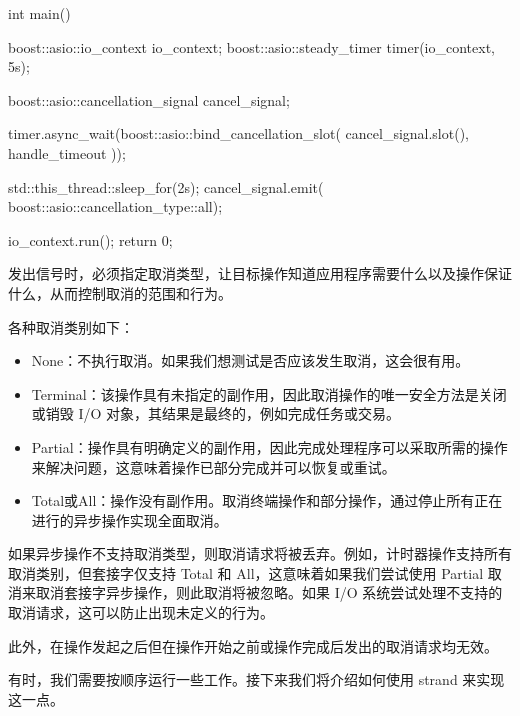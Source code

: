 \begin{cpp}
int main() {
    boost::asio::io_context io_context;
    boost::asio::steady_timer timer(io_context, 5s);

    boost::asio::cancellation_signal cancel_signal;

    timer.async_wait(boost::asio::bind_cancellation_slot(
        cancel_signal.slot(),
        handle_timeout
    ));

    std::this_thread::sleep_for(2s);
    cancel_signal.emit(
        boost::asio::cancellation_type::all);

    io_context.run();
    return 0;
}
\end{cpp}

发出信号时，必须指定取消类型，让目标操作知道应用程序需要什么以及操作保证什么，从而控制取消的范围和行为。

各种取消类别如下：

\begin{itemize}
\item
None：不执行取消。如果我们想测试是否应该发生取消，这会很有用。

\item
Terminal：该操作具有未指定的副作用，因此取消操作的唯一安全方法是关闭或销毁 I/O 对象，其结果是最终的，例如完成任务或交易。

\item
Partial：操作具有明确定义的副作用，因此完成处理程序可以采取所需的操作来解决问题，这意味着操作已部分完成并可以恢复或重试。

\item
Total或All：操作没有副作用。取消终端操作和部分操作，通过停止所有正在进行的异步操作实现全面取消。
\end{itemize}

如果异步操作不支持取消类型，则取消请求将被丢弃。例如，计时器操作支持所有取消类别，但套接字仅支持 Total 和 All，这意味着如果我们尝试使用 Partial 取消来取消套接字异步操作，则此取消将被忽略。如果 I/O 系统尝试处理不支持的取消请求，这可以防止出现未定义的行为。

此外，在操作发起之后但在操作开始之前或操作完成后发出的取消请求均无效。

有时，我们需要按顺序运行一些工作。接下来我们将介绍如何使用 strand 来实现这一点。









































